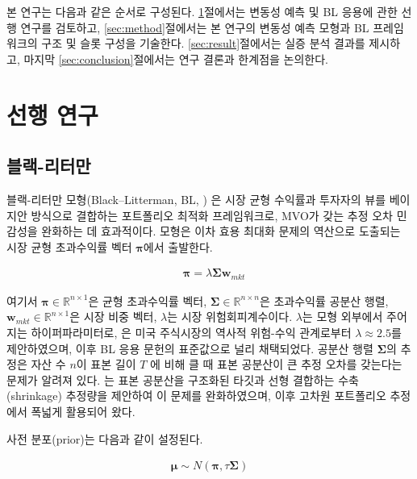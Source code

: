 \documentclass[eng]{kjas3}
\begin{document}
본 연구는 다음과 같은 순서로 구성된다. \ref{sec:related_work}절에서는 변동성 예측 및 BL 응용에 관한 선행 연구를 검토하고, \ref{sec:method}절에서는 본 연구의 변동성 예측 모형과 BL 프레임워크의 구조 및 슬롯 구성을 기술한다. \ref{sec:result}절에서는 실증 분석 결과를 제시하고, 마지막 \ref{sec:conclusion}절에서는 연구 결론과 한계점을 논의한다.

\section{선행 연구}\label{sec:related_work}

\subsection{블랙-리터만}
\label{subsec:bl_review}

블랙-리터만 모형(Black–Litterman, BL, \citealp{black1992}) 은 시장 균형 수익률과 투자자의 뷰를 베이지안 방식으로 결합하는 포트폴리오 최적화 프레임워크로, MVO가 갖는 추정 오차 민감성을 완화하는 데 효과적이다. 모형은 이차 효용 최대화 문제의 역산으로 도출되는 시장 균형 초과수익률 벡터 $\boldsymbol{\pi}$에서 출발한다.

\begin{align}\label{eq:bl_pi}
    & \boldsymbol{\pi} = \lambda\boldsymbol{\Sigma}\mathbf{w}_{mkt}
\end{align}

여기서 $\boldsymbol{\pi} \in \mathbb{R}^{n \times 1}$은 균형 초과수익률 벡터, $\boldsymbol{\Sigma}\in \mathbb{R}^{n \times n}$은 초과수익률 공분산 행렬, $\mathbf{w}_{mkt} \in \mathbb{R}^{n \times 1}$은 시장 비중 벡터, $\lambda$는 시장 위험회피계수이다. $\lambda$는 모형 외부에서 주어지는 하이퍼파라미터로, \citet{helitterman1999}은 미국 주식시장의 역사적 위험-수익 관계로부터 $\lambda \approx 2.5$를 제안하였으며, 이후 BL 응용 문헌의 표준값으로 널리 채택되었다. 공분산 행렬 $\boldsymbol{\Sigma}$의 추정은 자산 수 $n$이 표본 길이 $T$ 에 비해 클 때 표본 공분산이 큰 추정 오차를 갖는다는 문제가 알려져 있다. \citet{ledoitwolf2004}는 표본 공분산을 구조화된 타깃과 선형 결합하는 수축(shrinkage) 추정량을 제안하여 이 문제를 완화하였으며, 이후 고차원 포트폴리오 추정에서 폭넓게 활용되어 왔다.

사전 분포(prior)는 다음과 같이 설정된다.

\begin{align}\label{eq:bl_mu}
    \boldsymbol{\mu} \sim N(\boldsymbol{\pi}, \tau\boldsymbol{\Sigma})
\end{align}
\end{document}
